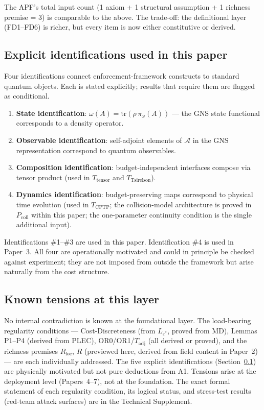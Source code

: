 \documentclass[11pt]{article}
\theoremstyle{remark}
\begin{document}
\smallskip\noindent The APF's total input count (1 axiom + 1 structural assumption + 1 richness premise = 3) is comparable to the above.  The trade-off: the definitional layer (FD1--FD6) is richer, but every item is now either constitutive or derived.



\subsection{Explicit identifications used in this paper}
\label{sec:identifications}

Four identifications connect enforcement-framework constructs to standard quantum objects.  Each is stated explicitly; results that require them are flagged as conditional.

\begin{enumerate}[nosep,leftmargin=2em,itemsep=4pt]
\item \textbf{State identification}: $\omega(A) = \mathrm{tr}(\rho\,\pi_\omega(A))$ — the GNS state functional corresponds to a density operator.
\item \textbf{Observable identification}: self-adjoint elements of $\mathcal{A}$ in the GNS representation correspond to quantum observables.
\item \textbf{Composition identification}: budget-independent interfaces compose via tensor product (used in $T_{\mathrm{tensor}}$ and $T_{\mathrm{Tsirelson}}$).
\item \textbf{Dynamics identification}: budget-preserving maps correspond to physical time evolution (used in $T_{\mathrm{CPTP}}$; the collision-model architecture is proved in $P_{\mathrm{coll}}$ within this paper; the one-parameter continuity condition is the single additional input).
\end{enumerate}

Identifications \#1--\#3 are used in this paper.  Identification \#4 is used in Paper~3.  All four are operationally motivated and could in principle be checked against experiment; they are not imposed from outside the framework but arise naturally from the cost structure.


\subsection{Known tensions at this layer}

No internal contradiction is known at the foundational layer. The load-bearing regularity conditions --- Cost-Discreteness (from $L_{\varepsilon^*}$, proved from MD), Lemmas P1--P4 (derived from PLEC), OR0/OR1/$T_{\mathrm{adj}}$ (all derived or proved), and the richness premises $R_{\mathrm{loc}}$, $R$ (previewed here, derived from field content in Paper~2) --- are each individually addressed. The five explicit identifications (Section~\ref{sec:identifications}) are physically motivated but not pure deductions from A1. Tensions arise at the deployment level (Papers~4--7), not at the foundation. The exact formal statement of each regularity condition, its logical status, and stress-test results (red-team attack surfaces) are in the Technical Supplement.
\end{document}
